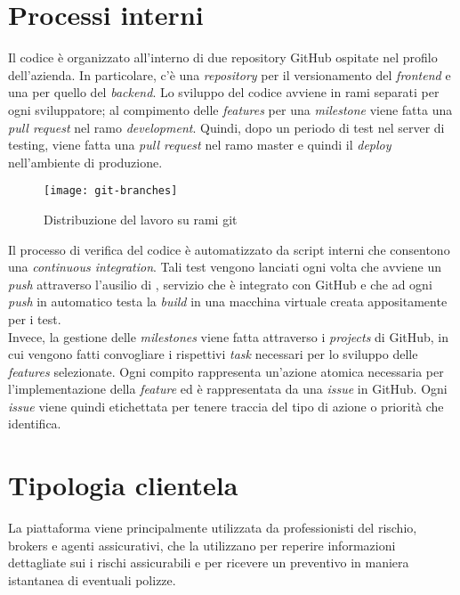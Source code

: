 \section{Processi interni}
Il codice è organizzato all'interno di due repository GitHub\cite{site:github} ospitate nel profilo dell'azienda. In particolare, c'è una \textit{repository} per il versionamento del \textit{frontend} e una per quello del \textit{backend}. Lo sviluppo del codice avviene in rami separati per ogni sviluppatore; al compimento delle \textit{features} per una \textit{milestone} viene fatta una \textit{pull request} nel ramo \textit{development}. Quindi, dopo un periodo di test nel server di testing, viene fatta una \textit{pull request} nel ramo master e quindi il \textit{deploy} nell'ambiente di produzione.
\begin{figure}[H] 
    \centering
    \texttt{[image: git-branches]} 
    \caption{Distribuzione del lavoro su rami git}
    \label{img:git-branches}
\end{figure}
Il processo di verifica del codice è automatizzato da script interni che consentono una \textit{continuous integration}. Tali test vengono lanciati ogni volta che avviene un \textit{push} attraverso l'ausilio di \cite{prod:circle-ci}, servizio che è integrato con GitHub e che ad ogni \textit{push} in automatico testa la \textit{build} in una macchina virtuale creata appositamente per i test.
\medskip
\\Invece, la gestione delle \textit{milestones} viene fatta attraverso i \textit{projects} di GitHub, in cui vengono fatti convogliare i rispettivi \textit{task} necessari per lo sviluppo delle \textit{features} selezionate. Ogni compito rappresenta un'azione atomica necessaria per l'implementazione della \textit{feature} ed è rappresentata da una \textit{issue} in GitHub. Ogni \textit{issue} viene quindi etichettata per tenere traccia del tipo di azione o priorità che identifica.


\section{Tipologia clientela}
La piattaforma viene principalmente utilizzata da professionisti del rischio, brokers e agenti assicurativi, che la utilizzano per reperire informazioni dettagliate sui i rischi assicurabili e per ricevere un preventivo in maniera istantanea di eventuali polizze.

